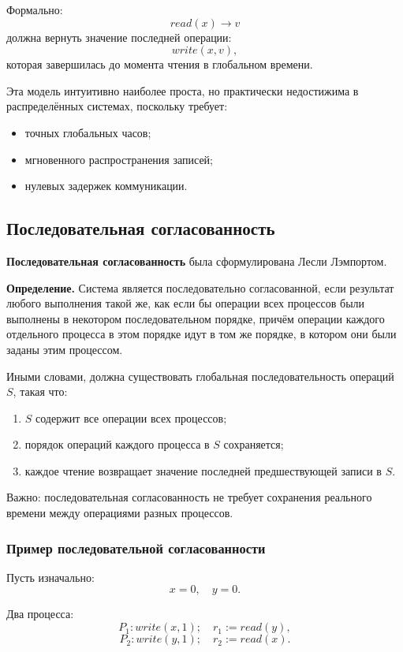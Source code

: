 \documentclass[12pt,a4paper]{article}
\begin{document}
Формально:
\[
read(x) \rightarrow v
\]
должна вернуть значение последней операции:
\[
write(x,v),
\]
которая завершилась до момента чтения в глобальном времени.

Эта модель интуитивно наиболее проста, но практически недостижима в распределённых системах, поскольку требует:
\begin{itemize}
    \item точных глобальных часов;
    \item мгновенного распространения записей;
    \item нулевых задержек коммуникации.
\end{itemize}

\subsection{Последовательная согласованность}

\textbf{Последовательная согласованность} была сформулирована Лесли Лэмпортом.

\textbf{Определение.}
Система является последовательно согласованной, если результат любого выполнения такой же, как если бы операции всех процессов были выполнены в некотором последовательном порядке, причём операции каждого отдельного процесса в этом порядке идут в том же порядке, в котором они были заданы этим процессом.

Иными словами, должна существовать глобальная последовательность операций $S$, такая что:
\begin{enumerate}
    \item $S$ содержит все операции всех процессов;
    \item порядок операций каждого процесса в $S$ сохраняется;
    \item каждое чтение возвращает значение последней предшествующей записи в $S$.
\end{enumerate}

Важно: последовательная согласованность не требует сохранения реального времени между операциями разных процессов.

\subsubsection{Пример последовательной согласованности}

Пусть изначально:
\[
x = 0,\quad y = 0.
\]

Два процесса:
\[
P_1: write(x,1); \quad r_1 := read(y),
\]
\[
P_2: write(y,1); \quad r_2 := read(x).
\]
\end{document}
